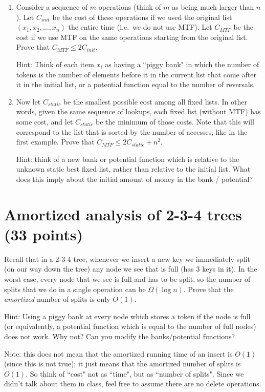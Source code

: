 \documentclass{article}
\begin{document}
\begin{enumerate}

	\item Consider a sequence of $m$ operations (think of $m$ as being much larger than $n$).  Let $C_{init}$ be the cost of these operations if we used the original list $(x_1, x_2, \dots, x_n)$ the entire time (i.e.~we do not use MTF).  Let $C_{MTF}$ be the cost if we use MTF on the same operations starting from the original list.  Prove that $C_{MTF} \leq 2 C_{init}$.  

		Hint: Think of each item $x_i$ as having a ``piggy bank" in which the number of tokens is the number of elements before it in the current list that come after it in the initial list, or a potential function equal to the number of reversals.  

	\item Now let $C_{static}$ be the smallest possible cost among all fixed lists.  In other words, given the same sequence of lookups, each fixed list (without MTF) has some cost, and let $C_{static}$ be the minimum of those costs.  Note that this will correspond to the list that is sorted by the number of accesses, like in the first example.  Prove that $C_{MTF} \leq 2C_{static} + n^2$.

		Hint: think of a new bank or potential function which is relative to the unknown static best fixed list, rather than relative to the initial list.  What does this imply about the initial amount of money in the bank / potential?
\end{enumerate}

\section{Amortized analysis of 2-3-4 trees (33 points)}

Recall that in a 2-3-4 tree, whenever we insert a new key we immediately split (on our way down the tree) any node we see that is full (has 3 keys in it).  In the worst case, every node that we see is full and has to be split, so the number of splits that we do in a single operation can be $\Omega(\log n)$.  Prove that the \emph{amortized} number of splits is only $O(1)$.  

Hint: Using a piggy bank at every node which stores a token if the node is full (or equivalently, a potential function which is equal to the number of full nodes) does not work.  Why not?  Can you modify the banks/potential functions?

Note: this does not mean that the amortized running time of an insert is $O(1)$ (since this is not true); it just means that the amortized number of splits is $O(1)$.  So think of ``cost" not as ``time", but as ``number of splits".  Since we didn't talk about them in class, feel free to assume there are no delete operations.  
\end{document}

